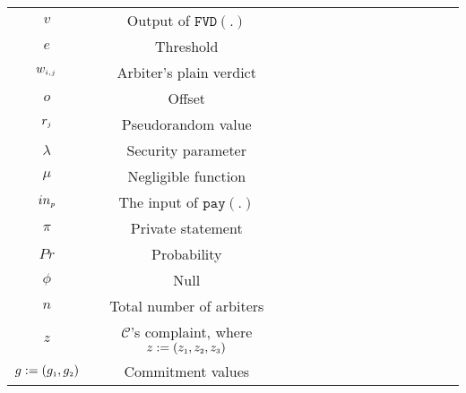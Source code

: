 \begin{table*}[!htbp]
\begin{scriptsize}
\begin{center}
{{\begin{tabular}{|c|c|c|c|c|c|c|c|c|c|c|c|c|c|}
%
\cellcolor{gray!20}\scriptsize$v$ &\cellcolor{gray!20}\scriptsize  Output of $\mathtt{FVD}(.)$\\ 
%
\cellcolor{white!20}\scriptsize$e$ &\cellcolor{white!20}\scriptsize  Threshold\\ 
%            
 \cellcolor{gray!20}\scriptsize$w_{\scriptscriptstyle i,j}$ &\cellcolor{gray!20}\scriptsize  Arbiter's plain verdict\\ 
%     
\cellcolor{white!20}\scriptsize$o$ &\cellcolor{white!20}\scriptsize  Offset\\  
  \cellcolor{gray!20}\scriptsize$r_{\scriptscriptstyle j}$ &\cellcolor{gray!20}\scriptsize  Pseudorandom value\\   
\cellcolor{white!20}\scriptsize$\lambda$ &\cellcolor{white!20}\scriptsize Security parameter\\  
%
\cellcolor{gray!20}\scriptsize$\mu$ &\cellcolor{gray!20}\scriptsize Negligible function\\  


\cellcolor{white!20}\scriptsize$in_{\scriptscriptstyle p}$ &\cellcolor{white!20}\scriptsize The input of $\mathtt{pay}(.)$\\                    
%
\cellcolor{gray!20}\scriptsize$\pi$ &\cellcolor{gray!20}\scriptsize Private statement\\        
  \cellcolor{white!20}\scriptsize$Pr$ &\cellcolor{white!20}\scriptsize Probability\\   

%
\cellcolor{gray!20}\scriptsize$\phi$ &\cellcolor{gray!20}\scriptsize  Null\\ 
%
\cellcolor{white!20}\scriptsize$n$ &\cellcolor{white!20}\scriptsize  Total number of arbiters\\  
%           
\cellcolor{gray!20}\scriptsize$z$ &\cellcolor{gray!20}\scriptsize  $\mathcal{C}$'s complaint, where $z:=(z_{\scriptscriptstyle 1}, z_{\scriptscriptstyle 2}, z_{\scriptscriptstyle 3})$\\ 
%
\cellcolor{white!20}\scriptsize $g:=(g_{\scriptscriptstyle 1}, g_{\scriptscriptstyle 2})$&\cellcolor{white!20}\scriptsize  Commitment values \\    
%



\hline 


\end{tabular}}}
\end{center}
\end{scriptsize}
\end{table*}
